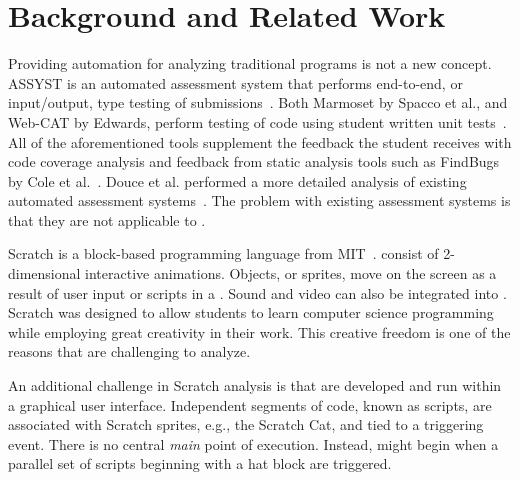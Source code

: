 \section{Background and Related Work}

Providing automation for analyzing traditional programs is not a new concept.
ASSYST is an automated assessment system that performs end-to-end, or
input/output, type testing of
submissions~\cite{Jackson:1997:GSP:268084.268210}. Both Marmoset by Spacco et
al., and Web-CAT by Edwards, perform testing of code using student written unit
tests~\cite{Spacco:2006:EMD:1140124.1140131,
  Edwards:2003:RCS:949344.949390}. All of the aforementioned tools supplement
the feedback the student receives with code coverage analysis and feedback from
static analysis tools such as FindBugs by Cole et
al.~\cite{Cole:2006:IYS:1176617.1176667}. Douce et al. performed a more
detailed analysis of existing automated assessment
systems~\cite{Douce:2005:ATA:1163405.1163409}.  The problem with existing
assessment systems is that they are not applicable to .

Scratch is a block-based programming language from
MIT~\cite{Maloney:2010:SPL:1868358.1868363}.   consist of
2-dimensional interactive animations.  Objects, or sprites, move on the screen
as a result of user input or scripts in a \sprogram{}.  Sound and video can
also be integrated into .  Scratch was designed to allow students
to learn computer science programming while employing great creativity in their
work.  This creative freedom is one of the reasons that  are
challenging to analyze.

An additional challenge in Scratch analysis is that  are developed
and run within a graphical user interface.  Independent segments of code, known
as scripts, are associated with Scratch sprites, e.g., the Scratch Cat, and
tied to a triggering event.  There is no central \emph{main} point of
execution.  Instead,  might begin when a parallel set of scripts
beginning with a \greenflag{} hat block are triggered.

